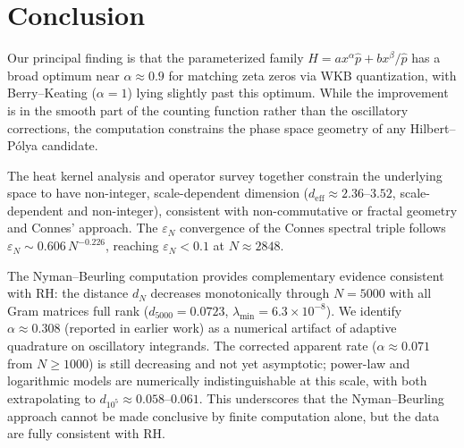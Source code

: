 \documentclass[11pt]{article}
\begin{document}
\section{Conclusion}

Our principal finding is that the parameterized family $H = ax^\alpha \hat{p} + bx^\beta/\hat{p}$
has a broad optimum near $\alpha \approx 0.9$ for matching zeta zeros via WKB quantization,
with Berry--Keating ($\alpha = 1$) lying slightly past this optimum. While the improvement
is in the smooth part of the counting function rather than the oscillatory corrections,
the computation constrains the phase space geometry of any Hilbert--P\'olya candidate.

The heat kernel analysis and operator survey together constrain the underlying space to
have non-integer, scale-dependent dimension ($d_{\mathrm{eff}} \approx 2.36$--$3.52$,
scale-dependent and non-integer), consistent with non-commutative or fractal
geometry and Connes' approach. The $\varepsilon_N$ convergence of the Connes spectral
triple follows $\varepsilon_N \sim 0.606\,N^{-0.226}$, reaching $\varepsilon_N < 0.1$ at
$N \approx 2848$.

The Nyman--Beurling computation provides complementary evidence consistent with RH:
the distance $d_N$ decreases monotonically through $N = 5000$ with all Gram matrices
full rank ($d_{5000} = 0.0723$, $\lambda_{\min} = 6.3\times10^{-8}$). We identify
$\alpha \approx 0.308$ (reported in earlier work) as a numerical artifact of adaptive
quadrature on oscillatory integrands. The corrected apparent rate ($\alpha \approx 0.071$
from $N \ge 1000$) is still decreasing and not yet asymptotic; power-law and logarithmic
models are numerically indistinguishable at this scale, with both extrapolating to
$d_{10^5} \approx 0.058$--$0.061$. This underscores that the Nyman--Beurling
approach cannot be made conclusive by finite computation alone, but the data are
fully consistent with RH.
\end{document}

